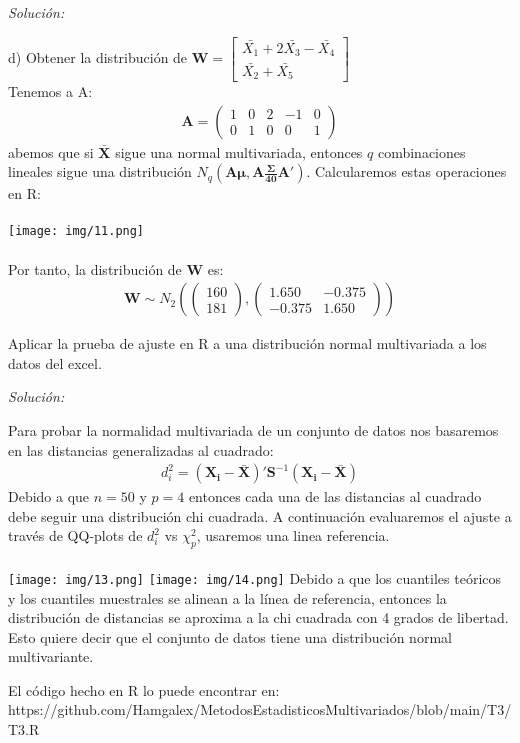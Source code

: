\documentclass[12pt]{article}
\newenvironment{problem}[2][Problema]{\begin{trivlist}
\item[\hskip \labelsep {\bfseries #1}\hskip \labelsep {\bfseries #2.}]}{\end{trivlist}}
\newenvironment{sol}
    {\emph{Solución:}
    }
    {
    }
\begin{document}
\begin{sol}
d) Obtener la distribución de $\mathbf{W}= \begin{bmatrix}
\bar{X_1} + 2\bar{X_3}-\bar{X_4} \\
\bar{X_2}+\bar{X_5}
\end{bmatrix}$\\
Tenemos a A:
\begin{align*}\mathbf{A}=
\begin{pmatrix}
1 & 0 & 2 & -1 & 0\\
0 & 1 & 0 & 0 & 1
\end{pmatrix}
\end{align*}
abemos que si $\mathbf{\bar{X}}$ sigue una normal multivariada, entonces  $q$ combinaciones lineales sigue una distribución $N_q(\mathbf{A \mu , A \frac{\Sigma}{40} A'})$. Calcularemos estas operaciones en R:\\\\
\texttt{[image: img/11.png]}\\\\
Por tanto, la distribución de $\mathbf{W}$ es:
\begin{align*}
\mathbf{W}\sim N_2(\begin{pmatrix}
160\\181
\end{pmatrix}, 
\begin{pmatrix}
1.650 & -0.375 \\
-0.375 & 1.650
\end{pmatrix})
\end{align*}
\end{sol}

\pagebreak

\begin{problem}{3}
Aplicar la prueba de ajuste en R a una distribución normal multivariada a los datos del excel.
\end{problem}

\begin{sol}
Para probar la normalidad multivariada de un conjunto de datos nos basaremos en las distancias generalizadas al cuadrado:
\begin{align*}
d_i^2=(\mathbf{X_i-\bar{X}})'\mathbf{S}^{-1}(\mathbf{X_i-\bar{X}})
\end{align*}
Debido a que $n=50$ y $p=4$ entonces cada una de las distancias al cuadrado debe seguir una distribución chi cuadrada. A continuación evaluaremos el ajuste a través de QQ-plots de $d_i^2$ vs $\chi_p^2$, usaremos una linea referencia.
\\\\
\texttt{[image: img/13.png]}
\texttt{[image: img/14.png]}
Debido a que los cuantiles teóricos y los cuantiles muestrales se alinean a la línea de referencia, entonces la distribución de distancias se aproxima a la chi cuadrada con 4 grados de libertad. Esto quiere decir que el conjunto de datos tiene una distribución normal multivariante.
\end{sol}

\pagebreak

El código hecho en R lo puede encontrar en:\\ https://github.com/Hamgalex/MetodosEstadisticosMultivariados/blob/main/T3/T3.R
\end{document}
